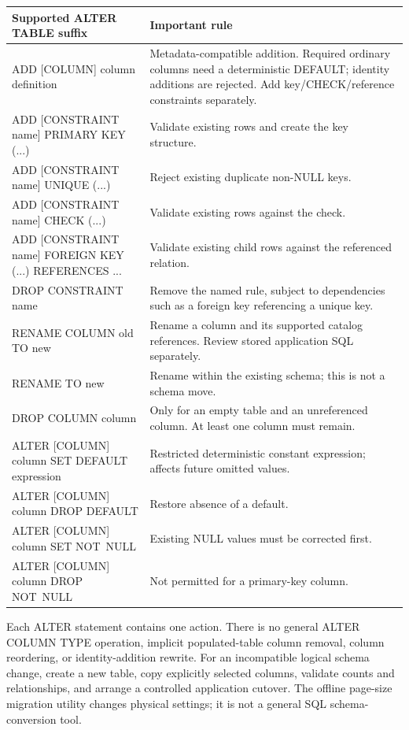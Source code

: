 \begin{longtable}{p{.48\linewidth}p{.45\linewidth}}
\toprule
Supported ALTER TABLE suffix & Important rule \\
\midrule
\endhead
ADD [COLUMN] column definition & Metadata-compatible addition. Required ordinary columns need a deterministic DEFAULT; identity additions are rejected. Add key/CHECK/reference constraints separately. \\
ADD [CONSTRAINT name] PRIMARY KEY (...) & Validate existing rows and create the key structure. \\
ADD [CONSTRAINT name] UNIQUE (...) & Reject existing duplicate non-NULL keys. \\
ADD [CONSTRAINT name] CHECK (...) & Validate existing rows against the check. \\
ADD [CONSTRAINT name] FOREIGN KEY (...) REFERENCES ... & Validate existing child rows against the referenced relation. \\
DROP CONSTRAINT name & Remove the named rule, subject to dependencies such as a foreign key referencing a unique key. \\
RENAME COLUMN old TO new & Rename a column and its supported catalog references. Review stored application SQL separately. \\
RENAME TO new & Rename within the existing schema; this is not a schema move. \\
DROP COLUMN column & Only for an empty table and an unreferenced column. At least one column must remain. \\
ALTER [COLUMN] column SET DEFAULT expression & Restricted deterministic constant expression; affects future omitted values. \\
ALTER [COLUMN] column DROP DEFAULT & Restore absence of a default. \\
ALTER [COLUMN] column SET \mbox{NOT NULL} & Existing NULL values must be corrected first. \\
ALTER [COLUMN] column DROP \mbox{NOT NULL} & Not permitted for a primary-key column. \\
\bottomrule
\end{longtable}

Each ALTER statement contains one action. There is no general ALTER COLUMN TYPE operation, implicit populated-table column removal, column reordering, or identity-addition rewrite. For an incompatible logical schema change, create a new table, copy explicitly selected columns, validate counts and relationships, and arrange a controlled application cutover. The offline page-size migration utility changes physical settings; it is not a general SQL schema-conversion tool.

